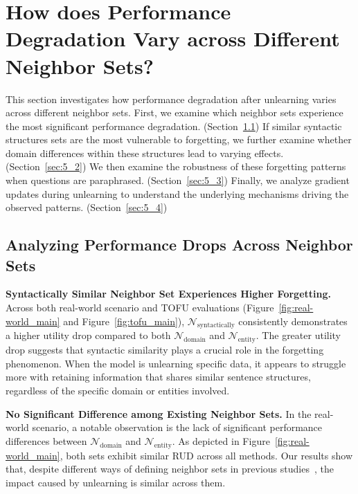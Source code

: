 
\section{How does Performance Degradation Vary across Different Neighbor Sets?}
\label{sec:problem}
This section investigates how performance degradation after unlearning varies across different neighbor sets.
First, we examine which neighbor sets experience the most significant performance degradation. (Section~\ref{sec:5_1}) If similar syntactic structures sets are the most vulnerable to forgetting, we further examine whether domain differences within these structures lead to varying effects. (Section~\ref{sec:5_2}) We then examine the robustness of these forgetting patterns when questions are paraphrased. (Section~\ref{sec:5_3}) Finally, we analyze gradient updates during unlearning to understand the underlying mechanisms driving the observed patterns. (Section~\ref{sec:5_4})

\subsection{Analyzing Performance Drops Across Neighbor Sets}
\label{sec:5_1}
\vspace{2pt}
\textbf{Syntactically Similar Neighbor Set Experiences Higher Forgetting.} Across both real-world scenario and  TOFU evaluations (Figure~\ref{fig:real-world_main} and Figure~\ref{fig:tofu_main}), $\mathcal{N}_{\text{syntactically}}$ consistently demonstrates a higher utility drop compared to both $\mathcal{N}_{\text{domain}}$ and $\mathcal{N}_{\text{entity}}$. The greater utility drop suggests that syntactic similarity plays a crucial role in the forgetting phenomenon.  When the model is unlearning specific data, it appears to struggle more with retaining information that shares similar sentence structures, regardless of the specific domain or entities involved.

\noindent \textbf{No Significant Difference among Existing Neighbor Sets.} In the real-world scenario, a notable observation is the lack of significant performance differences between $\mathcal{N}_{\text{domain}}$ and $\mathcal{N}_{\text{entity}}$. As depicted in Figure~\ref{fig:real-world_main}, both sets exhibit similar RUD across all methods. Our results show that, despite different ways of defining neighbor sets in previous studies~\citep{choi2024opt, closerlookat}, the impact caused by unlearning is similar across them.

